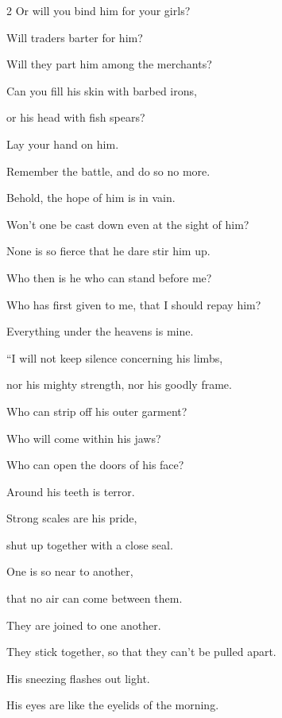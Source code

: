\begin{multicols}{2}
	Or will you bind him for your girls?
	
	\myverse{}Will traders barter for him?
	
	Will they part him among the merchants?
	
	\myverse{}Can you fill his skin with barbed irons,
	
	or his head with fish spears?
	
	\myverse{}Lay your hand on him.
	
	Remember the battle, and do so no more.
	
	\myverse{}Behold, the hope of him is in vain.
	
	Won’t one be cast down even at the sight of him?
	
	\vspace{\baselineskip}
	
	\myverse{}None is so fierce that he dare stir him up.
	
	Who then is he who can stand before me?
	
	\myverse{}Who has first given to me, that I should repay him?
	
	Everything under the heavens is mine.
	
	\vspace{\baselineskip}
	
	\myverse{}“I will not keep silence concerning his limbs,
	
	nor his mighty strength, nor his goodly frame.
	
	\myverse{}Who can strip off his outer garment?
	
	Who will come within his jaws?
	
	\myverse{}Who can open the doors of his face?
	
	Around his teeth is terror.
	
	\myverse{}Strong scales are his pride,
	
	shut up together with a close seal.
	
	\vspace{\baselineskip}
	
	\myverse{}One is so near to another,
	
	that no air can come between them.
	
	\myverse{}They are joined to one another.
	
	They stick together, so that they can’t be pulled apart.
	
	\myverse{}His sneezing flashes out light.
	
	His eyes are like the eyelids of the morning.
	

\end{multicols}
